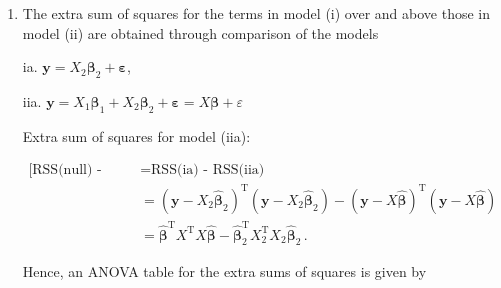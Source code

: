 \documentclass[
]{book}
\theoremstyle{definition}
\theoremstyle{definition}
\theoremstyle{definition}
\theoremstyle{definition}
\theoremstyle{remark}
\begin{document}
\begin{enumerate}
\def\labelenumi{\alph{enumi}.}
\setcounter{enumi}{2}
\item
  The extra sum of squares for the terms in model (i) over and above those in model (ii) are obtained through comparison of the models

  ia. \(\boldsymbol{y}= X_2\boldsymbol{\beta}_2 + \boldsymbol{\varepsilon}\),

  iia. \(\boldsymbol{y}= X_1\boldsymbol{\beta}_1 + X_2\boldsymbol{\beta}_2+ \boldsymbol{\varepsilon}= X\boldsymbol{\beta}+ \varepsilon\)

  Extra sum of squares for model (iia):

  \begin{align*}
  \mbox{[RSS(null) - RSS(iia)] - [RSS(null) - RSS(ia)]} & = \mbox{RSS(ia) - RSS(iia)}\\
  & = (\boldsymbol{y}- X_2\hat{\boldsymbol{\beta}}_2)^{\mathrm{T}}(\boldsymbol{y}- X_2\hat{\boldsymbol{\beta}}_2) - (\boldsymbol{y}- X\hat{\boldsymbol{\beta}})^{\mathrm{T}}(\boldsymbol{y}- X\hat{\boldsymbol{\beta}})\\
  & = \hat{\boldsymbol{\beta}}^{\mathrm{T}}X^{\mathrm{T}}X\hat{\boldsymbol{\beta}} - \hat{\boldsymbol{\beta}}_2^{\mathrm{T}}X_2^{\mathrm{T}}X_2\hat{\boldsymbol{\beta}}_2\,.
   \end{align*}

  Hence, an ANOVA table for the extra sums of squares is given by


\end{enumerate}
\end{document}
